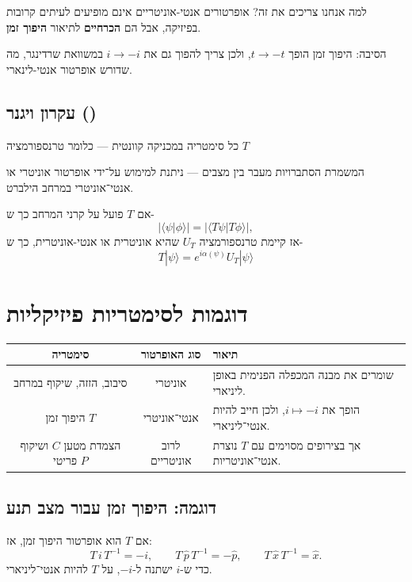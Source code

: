 \begin{notebox}{למה אנחנו צריכים את זה?}
אופרטורים אנטי-אוניטריים אינם מופיעים לעיתים קרובות בפיזיקה, אבל הם \textbf{הכרחיים} לתיאור \textbf{היפוך זמן}. 

הסיבה: היפוך זמן הופך $t \to -t$, ולכן צריך להפוך גם את $i \to -i$ במשוואת שרדינגר, מה שדורש אופרטור אנטי-לינארי.
\end{notebox}

\subsection*{עקרון ויגנר ()}

כל סימטריה במכניקה קוונטית — כלומר טרנספורמציה $T$ 

המשמרת הסתברויות מעבר בין מצבים — ניתנת למימוש על־ידי אופרטור אוניטרי
או אנטי־אוניטרי במרחב הילברט.

אם $T$ פועל על קרני המרחב כך ש-
\[
|\langle\psi|\phi\rangle|=|\langle T\psi|T\phi\rangle|,
\]
 אז קיימת טרנספורמציה $U_{T}$ שהיא אוניטרית או אנטי-אוניטרית, כך
ש-
\[
T|\psi\rangle=e^{i\alpha(\psi)}U_{T}|\psi\rangle
\]

\section*{דוגמות לסימטריות פיזיקליות}

\begin{center}
\begin{tabular}{|c|c|p{8cm}|}
\hline
\textbf{סימטריה} & \textbf{סוג האופרטור} & \textbf{תיאור} \\
\hline
סיבוב, הזזה, שיקוף במרחב & אוניטרי &
שומרים את מבנה המכפלה הפנימית באופן ליניארי. \\
\hline
היפוך זמן $T$ & אנטי־אוניטרי &
הופך את $i \mapsto -i$, ולכן חייב להיות אנטי־ליניארי. \\
\hline
הצמדת מטען $C$ ושיקוף פריטי $P$ & לרוב אוניטריים &
אך בצירופים מסוימים עם $T$ נוצרת אנטי־אוניטריות. \\
\hline
\end{tabular}
\end{center}

\subsection*{דוגמה: היפוך זמן עבור מצב תנע}

אם $T$ הוא אופרטור היפוך זמן, אז:
\[
T\, i \, T^{-1} = -i, \qquad
T\, \hat{p} \, T^{-1} = -\hat{p}, \qquad
T\, \hat{x} \, T^{-1} = \hat{x}.
\]
כדי ש-$i$ ישתנה ל-$-i$, על $T$ להיות אנטי־ליניארי.

